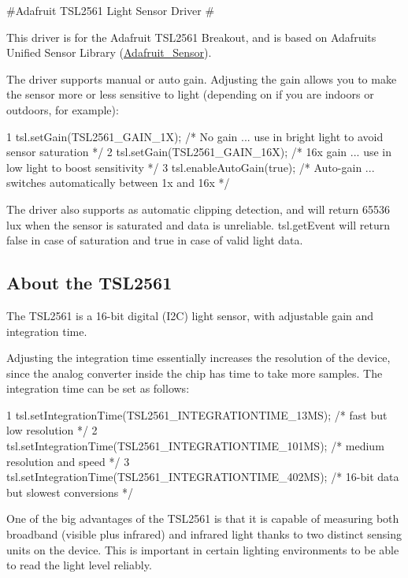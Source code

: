 \#\+Adafruit T\+S\+L2561 Light Sensor Driver \#

This driver is for the Adafruit T\+S\+L2561 Breakout, and is based on Adafruit\textquotesingle{}s Unified Sensor Library (\hyperlink{class_adafruit___sensor}{Adafruit\+\_\+\+Sensor}).

The driver supports manual or \textquotesingle{}auto\textquotesingle{} gain. Adjusting the gain allows you to make the sensor more or less \textquotesingle{}sensitive\textquotesingle{} to light (depending on if you are indoors or outdoors, for example)\+: 
\begin{DoxyCode}
1 tsl.setGain(TSL2561\_GAIN\_1X);      /* No gain ... use in bright light to avoid sensor saturation */
2 tsl.setGain(TSL2561\_GAIN\_16X);     /* 16x gain ... use in low light to boost sensitivity */
3 tsl.enableAutoGain(true);          /* Auto-gain ... switches automatically between 1x and 16x */
\end{DoxyCode}


The driver also supports as automatic clipping detection, and will return \textquotesingle{}65536\textquotesingle{} lux when the sensor is saturated and data is unreliable. tsl.\+get\+Event will return false in case of saturation and true in case of valid light data.

\subsection*{About the T\+S\+L2561}

The T\+S\+L2561 is a 16-\/bit digital (I2C) light sensor, with adjustable gain and \textquotesingle{}integration time\textquotesingle{}.

Adjusting the \textquotesingle{}integration time\textquotesingle{} essentially increases the resolution of the device, since the analog converter inside the chip has time to take more samples. The integration time can be set as follows\+: 
\begin{DoxyCode}
1 tsl.setIntegrationTime(TSL2561\_INTEGRATIONTIME\_13MS);      /* fast but low resolution */
2 tsl.setIntegrationTime(TSL2561\_INTEGRATIONTIME\_101MS);  /* medium resolution and speed   */
3 tsl.setIntegrationTime(TSL2561\_INTEGRATIONTIME\_402MS);  /* 16-bit data but slowest conversions */
\end{DoxyCode}


One of the big advantages of the T\+S\+L2561 is that it is capable of measuring both broadband (visible plus infrared) and infrared light thanks to two distinct sensing units on the device. This is important in certain lighting environments to be able to read the light level reliably.

